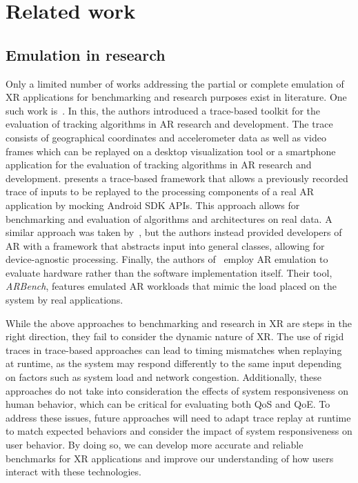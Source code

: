 \section{Related work}

\subsection{Emulation in  research}

Only a limited number of works addressing the partial or complete emulation of XR applications for benchmarking and research purposes exist in literature.
One such work is~\cite{williams2013transform}.
In this, the authors introduced a trace-based toolkit for the evaluation of tracking algorithms in \gls{AR} research and development.
The trace consists of geographical coordinates and accelerometer data as well as video frames which can be replayed on a desktop visualization tool or a smartphone application for the evaluation of tracking algorithms in \gls{AR} research and development.\@
\cite{munro2016aaremu} presents a trace-based framework that allows a previously recorded trace of inputs to be replayed to the processing components of a real \gls{AR} application by mocking Android \gls{SDK} \glspl{API}.
This approach allows for benchmarking and evaluation of algorithms and architectures on real data.
A similar approach was taken by~\cite{choi2022emulating}, but the authors instead provided developers of \gls{AR} with a framework that abstracts input into general classes, allowing for device-agnostic processing.
Finally, the authors of~\cite{chetoui2022arbench} employ \gls{AR} emulation to evaluate hardware rather than the software implementation itself.
Their tool, \emph{ARBench}, features emulated \gls{AR} workloads that mimic the load placed on the system by real applications.

While the above approaches to benchmarking and research in \gls{XR} are steps in the right direction, they fail to consider the dynamic nature of \gls{XR}.
The use of rigid traces in trace-based approaches can lead to timing mismatches when replaying at runtime, as the system may respond differently to the same input depending on factors such as system load and network congestion.
Additionally, these approaches do not take into consideration the effects of system responsiveness on human behavior, which can be critical for evaluating both \gls{QoS} and \gls{QoE}.
To address these issues, future approaches will need to adapt trace replay at runtime to match expected behaviors and consider the impact of system responsiveness on user behavior.
By doing so, we can develop more accurate and reliable benchmarks for \gls{XR} applications and improve our understanding of how users interact with these technologies.

